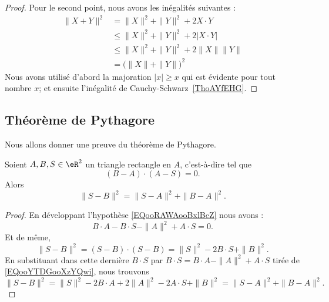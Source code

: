 \begin{proof}
    Pour le second point, nous avons les inégalités suivantes :
	\begin{subequations}
		\begin{align}
			\| X+Y \|^2&=\| X \|^2+\| Y \|^2+2X\cdot Y\\
			&\leq\| X \|^2+\| Y \|^2+2|X\cdot Y|\\
			&\leq\| X \|^2+\| Y \|^2+2\| X \|\| Y \|\\
			&=\big( \| X \|+\| Y \| \big)^2
		\end{align}
	\end{subequations}
    Nous avons utilisé d'abord la majoration $| x |\geq x$ qui est évidente pour tout nombre $x$; et ensuite l'inégalité de Cauchy-Schwarz~\ref{ThoAYfEHG}.
\end{proof}

\subsection{Théorème de Pythagore}

Nous allons donner une preuve du théorème de Pythagore.

\begin{theorem}     \label{THOooHXHWooCpcDan}
    Soient \( A,B,S\in \eR^2\) un triangle rectangle en \( A\), c'est-à-dire tel que
    \begin{equation}        \label{EQooRAWAooBxlBcZ}
        (B-A)\cdot (A-S)=0.
    \end{equation}
    Alors
    \begin{equation}
        \| S-B \|^2=\| S-A \|^2+\| B-A \|^2.
    \end{equation}
\end{theorem}

\begin{proof}
    En développant l'hypothèse \eqref{EQooRAWAooBxlBcZ} nous avons :
    \begin{equation}    \label{EQooYTDGooXzYQwi}
        B\cdot A-B\cdot S-\| A \|^2+A\cdot S=0.
    \end{equation}
    Et de même,
    \begin{equation}
        \| S-B \|^2=(S-B)\cdot(S-B)=\| S \|^2-2B\cdot S+\| B \|^2.
    \end{equation}
    En substituant dans cette dernière \( B\cdot S\) par \( B\cdot S=B\cdot A -\| A \|^2+A\cdot S \) tirée de \eqref{EQooYTDGooXzYQwi}, nous trouvons
    \begin{equation}
        \| S-B \|^2=\| S \|^2-2B\cdot A+2\| A \|^2-2A\cdot S+\| B \|^2=\| S-A \|^2+\| B-A \|^2.
    \end{equation}
\end{proof}

